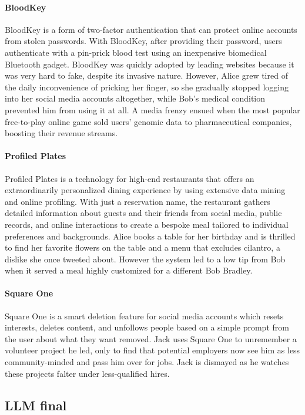 \paragraph{BloodKey}
BloodKey is a form of two-factor authentication that can protect online accounts from stolen passwords. With BloodKey, after providing their password, users authenticate with a pin-prick blood test using an inexpensive biomedical Bluetooth gadget. BloodKey was quickly adopted by leading websites because it was very hard to fake, despite its invasive nature. However, Alice grew tired of the daily inconvenience of pricking her finger, so she gradually stopped logging into her social media accounts altogether, while Bob's medical condition prevented him from using it at all. A media frenzy ensued when the most popular free-to-play online game sold users' genomic data to pharmaceutical companies, boosting their revenue streams.

\paragraph{Profiled Plates} 
Profiled Plates is a technology for high-end restaurants that offers an extraordinarily personalized dining experience by using extensive data mining and online profiling. With just a reservation name, the restaurant gathers detailed information about guests and their friends from social media, public records, and online interactions to create a bespoke meal tailored to individual preferences and backgrounds. Alice books a table for her birthday and is thrilled to find her favorite flowers on the table and a menu that excludes cilantro, a dislike she once tweeted about. However the system led to a low tip from Bob when it served a meal highly customized for a different Bob Bradley. 

\paragraph{Square One}
Square One is a smart deletion feature for social media accounts which resets interests, deletes content, and unfollows people based on a simple prompt from the user about what they want removed. Jack uses Square One to unremember a volunteer project he led, only to find that potential employers now see him as less community-minded and pass him over for jobs. Jack is dismayed as he watches these projects falter under less-qualified hires.

\subsection{LLM final}
